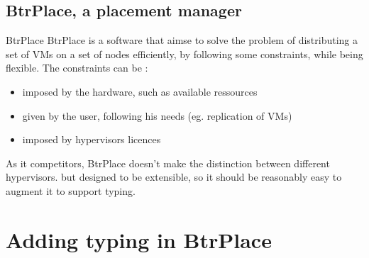 \documentclass{beamer}
\begin{document}
\subsection{BtrPlace, a placement manager}
\begin{frame}{BtrPlace}
BtrPlace is a software that aimse to solve the problem of distributing a set of VMs on
a set of nodes efficiently, by following some constraints, while
being flexible. The constraints can be :
\begin{itemize}
	\item imposed by the hardware, such as available ressources
	\item given by the user, following his needs (eg. replication
		of VMs)
	\item imposed by hypervisors licences
\end{itemize}
\pause As it competitors, BtrPlace doesn't make the distinction
between different hypervisors. but designed to be extensible,
so it should be reasonably easy to augment it to support typing.
\end{frame}
\section{Adding typing in BtrPlace}
\end{document}
